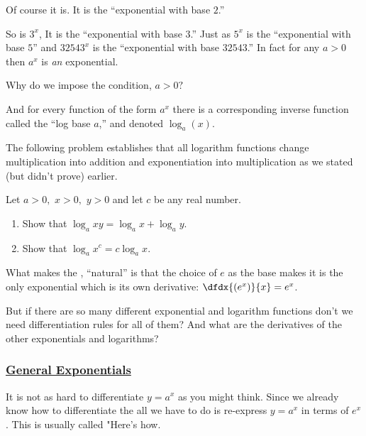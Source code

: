 Of course it is. It is the ``exponential with base $2$.''

So is $3^x$, It is the ``exponential with base $3$.'' Just as $5^x$ is
the ``exponential with base $5$'' and $32543^x$ is the ``exponential
with base $32543$.'' In fact for any $a>0$ then $a^x$ is \emph{an}
exponential.
\begin{ProficiencyDrill}
  Why do we impose the condition, $a>0?$
\end{ProficiencyDrill}
And  for every function of the form $a^x$ there is a corresponding 
inverse function called the ``log base $a$,'' and denoted $\log_a(x)$.

The following problem establishes that all logarithm functions change
multiplication into addition and exponentiation into multiplication as
we stated (but didn't prove) earlier.
\begin{embeddedproblem}{}
  Let $a>0,$ $x>0,$ $y>0$ and  let $c$ be any real number.
  \begin{enumerate}[label={\bf{}(\alph*)}]
  \item Show that $\log_a  xy=\log_a x+\log_a y.$
  \item Show that $\log_a x^c =c \log_a x.$
  \end{enumerate}
\end{embeddedproblem}

What makes the , ``natural'' is that the choice
of $e$ as the base makes it is the only exponential which is its own
derivative: $\dfdx{(e^x)}{x}=e^x$.

But if there are so many different exponential and logarithm functions
don't we need differentiation rules for all of them? And what are the
derivatives of the other exponentials and logarithms?

\subsubsection*{\underline{General Exponentials}}
It is not as hard to differentiate $y=a^x$ as you might think. Since
we already know how to differentiate the 
all we have to do is re-express $y=a^x$ in terms of $e^x$. This is
usually called "Here's how.

